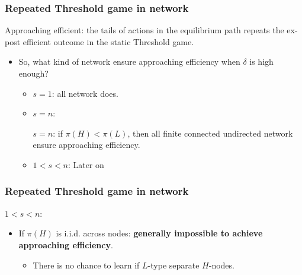 \documentclass{beamer}
\begin{document}
\begin{frame}
  \frametitle{Repeated Threshold game in network}


  \begin{definition}
  Approaching efficient: the tails of actions in the equilibrium path repeats the ex-post efficient outcome in the static Threshold game.
  \end{definition}
  \begin{itemize}
  \item So, what kind of network ensure approaching efficiency when $\delta$ is high enough?
  \begin{itemize}
  \item $s=1$: all network does.
  \item $s=n$: 
  \begin{theorem}
$s=n$: if $\pi(H)<\pi(L)$, then all finite connected undirected network ensure approaching efficiency.
\end{theorem}
  \item $1<s<n$: {\color{red} Later on}
  \end{itemize}
  \end{itemize}
 


\end{frame}




\begin{frame}
  \frametitle{Repeated Threshold game in network}

$1<s<n$:
  \begin{itemize}
  \item If $\pi(H)$ is i.i.d. across nodes: \textbf{generally impossible to achieve approaching efficiency}.
  \begin{center}
\end{center}

\begin{itemize}
\item There is no chance to learn if $L$-type separate $H$-nodes.
\end{itemize}

  \end{itemize} 

\end{frame}
\end{document}
